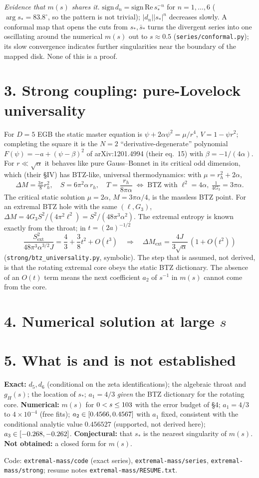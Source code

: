 \documentclass[10pt,a4paper]{article}
\newcommand{\ext}{\mathrm{ext}}
\begin{document}
\emph{Evidence that $m(s)$ shares it.} $\mathrm{sign}\,d_n=\mathrm{sign}\,\mathrm{Re}\,s_*^{-n}$
for $n=1,\dots,6$ ($\arg s_*=83.8^\circ$, so the pattern is not trivial); $|d_n||s_*|^n$
decreases slowly. A conformal map that opens the cuts from $s_*,\bar s_*$ turns the divergent
series into one oscillating around the numerical $m(s)$ out to $s\approx0.5$
(\texttt{series/conformal.py}); its slow convergence indicates further singularities near the
boundary of the mapped disk. None of this is a proof.

\section*{3. Strong coupling: pure-Lovelock universality}
For $D=5$ EGB the static master equation is $\psi+2\alpha\psi^2=\mu/r^4$, $V=1-\psi r^2$;
completing the square it is the $N=2$ ``derivative-degenerate'' polynomial
$F(\psi)=-a+(\psi-\beta)^2$ of arXiv:1201.4994 (their eq.\ 15) with $\beta=-1/(4\alpha)$.
For $r\ll\sqrt\alpha$ it behaves like pure Gauss--Bonnet in its critical odd dimension,
which (their \S IV) has BTZ-like, universal thermodynamics: with $\mu=r_h^2+2\alpha$,
\[ \Delta M=\tfrac{3\pi}{8}r_h^2,\quad S=6\pi^2\alpha\, r_h,\quad T=\frac{r_h}{8\pi\alpha}
\;\Longleftrightarrow\; \text{BTZ with }\ell^2=4\alpha,\ \tfrac1{4G_3}=3\pi\alpha . \]
The critical static solution $\mu=2\alpha$, $M=3\pi\alpha/4$, is the massless BTZ point.
For an extremal BTZ hole with the same $(\ell,G_3)$, $\Delta M=4G_3S^2/(4\pi^2\ell^2)=S^2/(48\pi^3\alpha^2)$.
The extremal entropy is known exactly from the throat; in $t=(2a)^{-1/2}$
\[ \frac{S_\ext^2}{48\pi^3\alpha^{3/2}J}=\frac43+\frac38t^2+O(t^3)
\quad\Longrightarrow\quad \Delta M_\ext=\frac{4J}{3\sqrt\alpha}\,(1+O(t^2)) \]
(\texttt{strong/btz\_universality.py}, symbolic). The step that is assumed, not derived, is
that the rotating extremal core obeys the static BTZ dictionary. The absence of an $O(t)$ term
means the next coefficient $a_2$ of $s^{-1}$ in $m(s)$ cannot come from the core.

\section*{4. Numerical solution at large $s$}


\section*{5. What is and is not established}
\textbf{Exact:} $d_5,d_6$ (conditional on the zeta identifications); the algebraic throat and
$g_H(s)$; the location of $s_*$; $a_1=4/3$ \emph{given} the BTZ dictionary for the rotating core.
\textbf{Numerical:} $m(s)$ for $0<s\le103$ with the error budget of \S4;
$a_1=4/3$ to $4\times10^{-4}$ (free fits); $a_2\in[0.4566,0.4567]$ with $a_1$ fixed, consistent with the
conditional analytic value $0.456527$ (supported, not derived here); $a_3\in[-0.268,-0.262]$.
\textbf{Conjectural:} that $s_*$ is the nearest singularity of $m(s)$. \textbf{Not obtained:} a closed form for $m(s)$.

\vfill
{\footnotesize Code: \texttt{extremal-mass/code} (exact series), \texttt{extremal-mass/series},
\texttt{extremal-mass/strong}; resume notes \texttt{extremal-mass/RESUME.txt}.}
\end{document}
